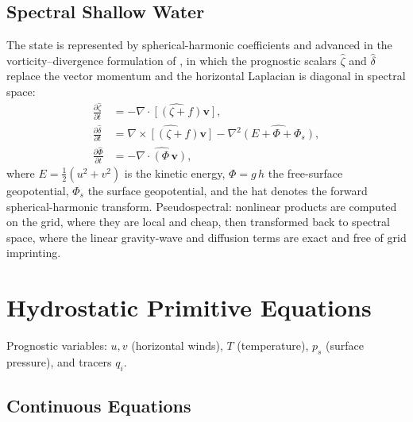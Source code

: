 \documentclass[11pt,twoside]{report}
\newcommand{\pp}{\partial}
\newcommand{\half}{\tfrac{1}{2}}
\newcommand{\vect}[1]{\bm{#1}}
\newcommand{\divg}{\nabla\!\cdot\!}
\newcommand{\curl}{\nabla\!\times\!}
\begin{document}
\subsection{Spectral Shallow Water}

The state is represented by spherical-harmonic coefficients and advanced in the
vorticity--divergence formulation of \citet{Bourke1972}, in which the prognostic
scalars $\hat\zeta$ and $\hat\delta$ replace the vector momentum and the
horizontal Laplacian is diagonal in spectral space:
\begin{align}
  \frac{\pp\hat\zeta}{\pp t} &= -\widehat{\divg[(\zeta+f)\vect{v}]}, \\
  \frac{\pp\hat\delta}{\pp t} &= \widehat{\curl[(\zeta+f)\vect{v}]}
    - \nabla^2\widehat{(E+\Phi+\Phi_s)}, \\
  \frac{\pp\hat\Phi}{\pp t} &= -\widehat{\divg(\Phi\,\vect{v})},
\end{align}
where $E=\half(u^2+v^2)$ is the kinetic energy, $\Phi=g\,h$ the free-surface
geopotential, $\Phi_s$ the surface geopotential, and the hat denotes the
forward spherical-harmonic transform. Pseudospectral: nonlinear products are
computed on the grid, where they are local and cheap, then transformed back to
spectral space, where the linear gravity-wave and diffusion terms are exact and
free of grid imprinting.


\section{Hydrostatic Primitive Equations}
\label{sec:pe}

Prognostic variables: $u,v$ (horizontal winds), $T$ (temperature),
$p_s$ (surface pressure), and tracers $q_i$.

\subsection{Continuous Equations}
\end{document}
